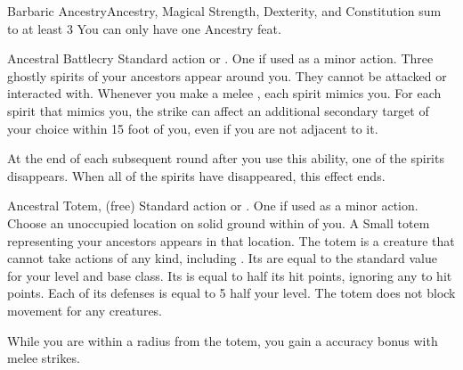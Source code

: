    \begin{magicalfeat}{Barbaric Ancestry}{Ancestry, Magical}
        \featpre Strength, Dexterity, and Constitution sum to at least 3
         You can only have one Ancestry feat.

        \begin{magicalactiveability}{Ancestral Battlecry}
            \abilityusagetime Standard action or .
            \abilitycost One  if used as a minor action.
            \rankline
            Three ghostly spirits of your ancestors appear around you.
            They cannot be attacked or interacted with.
            Whenever you make a melee , each spirit mimics you.
            For each spirit that mimics you, the strike can affect an additional secondary target of your choice within 15 foot  of you, even if you are not adjacent to it.

            At the end of each subsequent round after you use this ability, one of the spirits disappears.
            When all of the spirits have disappeared, this effect ends.
        \end{magicalactiveability}

        \begin{magicalsustainability}{Ancestral Totem}{,  (free)}
            \abilityusagetime Standard action or .
            \abilitycost One  if used as a minor action.
            \rankline
            Choose an unoccupied location on solid ground within \longrange of you.
            A Small totem representing your ancestors appears in that location.
            The totem is a creature that cannot take actions of any kind, including .
            Its  are equal to the standard value for your level and base class.
            Its  is equal to half its hit points, ignoring any  to hit points.
            Each of its defenses is equal to 5 \add half your level.
            The totem does not block movement for any creatures.

            While you are within a \medarea radius  from the totem, you gain a  accuracy bonus with melee strikes.
        \end{magicalsustainability}


\end{magicalfeat}

